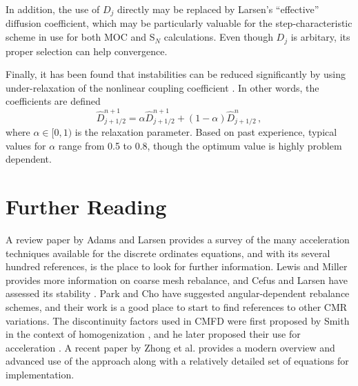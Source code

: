 In addition, the use of $D_j$ directly may be replaced by 
Larsen's ``effective'' diffusion coefficient, which may be particularly
valuable for the step-characteristic scheme in use for both MOC and S$_N$
calculations.  Even though $D_j$ is arbitary, its proper selection can 
help convergence.


Finally, it has been found that instabilities can be reduced 
significantly by using under-relaxation of the 
nonlinear coupling coefficient \cite{}.  In other words, 
the coefficients are defined
\begin{equation}
 \hat{D}^{n+1}_{j+1/2} = \alpha \hat{D}^{n+1}_{j+1/2} + (1-\alpha)\hat{D}^{n}_{j+1/2}  \, ,
\end{equation}
where  $\alpha \in [0, 1)$ is the relaxation parameter.  Based on 
past experience, typical values for $\alpha$ range from 0.5 to 0.8, 
though the optimum value is highly problem dependent.





\section*{Further Reading}

A review paper by Adams and Larsen \cite{adams2002fim} provides a survey of the 
many acceleration techniques available for the discrete ordinates equations, and 
with its several hundred references, is the place to look for further 
information.  Lewis and Miller provides more information on coarse mesh 
rebalance, and Cefus and Larsen have assessed its stability \cite{cefus1990sac}. 
 Park and Cho \cite{park2004cma} have suggested angular-dependent rebalance 
schemes, and their work is a good place to start to find references to other CMR 
variations.  The discontinuity factors used in CMFD were first proposed by Smith 
in the context of homogenization \cite{smith1980shm}, and he later proposed 
their use for acceleration \cite{smith1983nms}. A recent paper by Zhong et al. 
\cite{zhong2008itl} provides a modern overview and advanced use of the approach 
along with a relatively detailed set of equations for implementation.  


